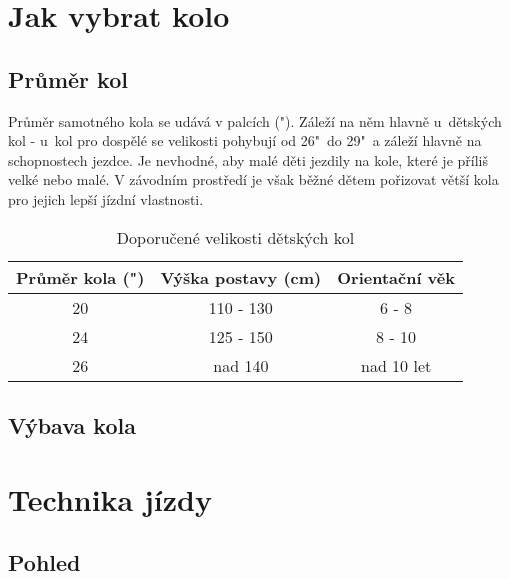 \documentclass[11pt]{article}
\begin{document}
\section[Výběr kola]{Jak vybrat kolo}
\subsection{Průměr kol}
Průměr samotného kola se udává v palcích ("). Záleží na něm hlavně u~dětských kol - u~kol pro dospělé se velikosti pohybují od 26"~do 29"~a záleží hlavně na schopnostech jezdce. 
\newline Je nevhodné, aby malé děti jezdily na kole, které je příliš velké nebo malé. V závodním prostředí je však běžné dětem pořizovat větší kola pro jejich lepší jízdní vlastnosti. 
\begin{table}[h]
    \centering
    \begin{tabular}{|c | c | c |} 
        \hline
        Průměr kola (")& Výška postavy (cm) & Orientační věk \\ 
        \hline\hline
        20 & 110 - 130 & 6 - 8 \\ 
        \hline
        24 & 125 - 150 & 8 - 10 \\
        \hline
        26 & nad 140 & nad 10 let \\
        \hline
    \end{tabular}
\caption{\label{tab:detskakola}Doporučené velikosti dětských kol}
\end{table}

\subsection{Výbava kola}

\newpage
\section{Technika jízdy}

\subsection{Pohled}
\end{document}
